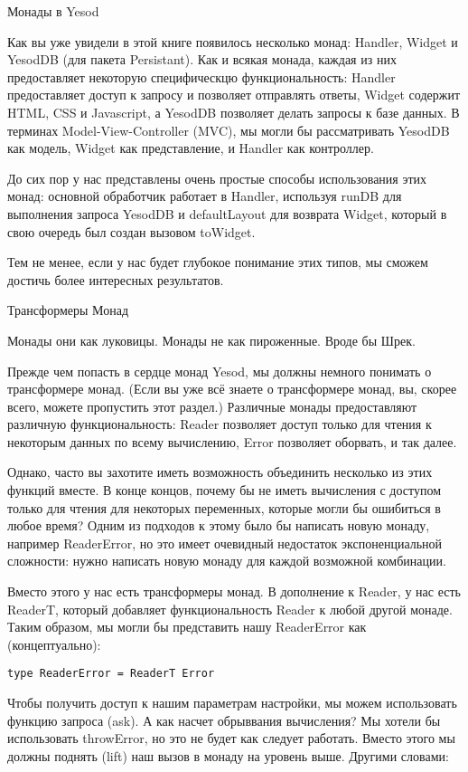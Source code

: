 Монады в Yesod

Как вы уже увидели в этой книге появилось несколько монад: Handler, Widget и YesodDB (для пакета Persistant). Как и всякая монада, каждая из них предоставляет некоторую специфическцю функциональность: Handler предоставляет доступ к запросу и позволяет отправлять ответы, Widget содержит HTML, CSS и Javascript, а YesodDB позволяет делать запросы к базе данных. В терминах Model-View-Controller (MVC), мы могли бы рассматривать YesodDB как модель, Widget как представление, и Handler как контроллер.

До сих пор у нас представлены очень простые способы использования этих монад: основной обработчик работает в Handler, используя runDB для выполнения запроса YesodDB и defaultLayout для возврата Widget, который в свою очередь был создан вызовом toWidget.

Тем не менее, если у нас будет глубокое понимание этих типов, мы сможем достичь более интересных результатов.

Трансформеры Монад

Монады они как луковицы. Монады не как пироженные. Вроде бы Шрек.

Прежде чем попасть в сердце монад Yesod, мы должны немного понимать о трансформере монад. (Если вы уже всё знаете о трансформере монад, вы, скорее всего, можете пропустить этот раздел.) Различные монады предоставляют различную функциональность: Reader позволяет доступ только для чтения к некоторым данных по всему вычислению, Error позволяет оборвать, и так далее.

Однако, часто вы захотите иметь возможность объединить несколько из этих функций вместе. В конце концов, почему бы не иметь вычисления с доступом только для чтения для некоторых переменных, которые могли бы ошибиться в любое время? Одним из подходов к этому было бы написать новую монаду, например ReaderError, но это имеет очевидный недостаток экспоненциальной сложности: нужно написать новую монаду для каждой возможной комбинации.

Вместо этого у нас есть трансформеры монад. В дополнение к Reader, у нас есть ReaderT, который добавляет функциональность Reader к любой другой монаде. Таким образом, мы могли бы представить нашу ReaderError как (концептуально):

\begin{lstlisting}
type ReaderError = ReaderT Error
\end{lstlisting}

Чтобы получить доступ к нашим параметрам настройки, мы можем использовать функцию запроса (ask). А как насчет обрыввания вычисления? Мы хотели бы использовать throwError, но это не будет как следует работать. Вместо этого мы должны поднять (lift) наш вызов в монаду на уровень выше. Другими словами:

